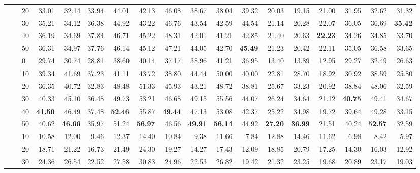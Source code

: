 \begin{table*}[!h]
{\begin{tabular}{lllrrr|rrr|rrr|rrr|rrr}
 \textbf{} & \textbf{} & 20 & 33.01 & 32.14 & 33.94 & 44.01 & 42.13 & 46.08 & 38.67 & 38.04 & 39.32 & 20.03 & 19.15 & 21.00 & 31.95 & 32.62 & 31.32 \\ 
 \textbf{} & \textbf{} & 30 & 35.21 & 34.12 & 36.38 & 44.92 & 43.22 & 46.76 & 43.54 & 42.59 & 44.54 & 21.14 & 20.28 & 22.07 & 36.05 & 36.69 & \textbf{35.42} \\ 
 \textbf{} & \textbf{} & 40 & 36.19 & 34.69 & 37.84 & 46.71 & 45.22 & 48.31 & 42.01 & 41.21 & 42.85 & 21.40 & 20.63 & \textbf{22.23} & 34.26 & 34.85 & 33.70 \\ 
 \textbf{} & \textbf{} & 50 & 36.31 & 34.97 & 37.76 & 46.14 & 45.12 & 47.21 & 44.05 & 42.70 & \textbf{45.49} & 21.23 & 20.42 & 22.11 & 35.05 & 36.58 & 33.65 \\ 
 \arrayrulecolor{gray}\cline{2-18}\arrayrulecolor{black}
\textbf{} & \textbf{\multirow{6}{*}{SC}} & 0 & 29.74 & 30.74 & 28.81 & 38.60 & 40.14 & 37.17 & 38.96 & 41.21 & 36.95 & 13.40 & 13.89 & 12.95 & 29.27 & 32.49 & 26.63 \\ 
 \textbf{} & \textbf{} & 10 & 39.34 & 41.69 & 37.23 & 41.11 & 43.72 & 38.80 & 44.44 & 50.00 & 40.00 & 22.81 & 28.70 & 18.92 & 30.92 & 38.59 & 25.80 \\ 
 \textbf{} & \textbf{} & 20 & 36.35 & 40.72 & 32.83 & 48.48 & 51.33 & 45.93 & 43.21 & 48.72 & 38.81 & 25.67 & 33.23 & 20.92 & 38.84 & 48.06 & 32.59 \\ 
 \textbf{} & \textbf{} & 30 & 40.33 & 45.10 & 36.48 & 49.73 & 53.21 & 46.68 & 49.15 & 55.56 & 44.07 & 26.24 & 34.64 & 21.12 & \textbf{40.75} & 49.41 & 34.67 \\ 
 \textbf{} & \textbf{} & 40 & \textbf{41.50} & 46.49 & 37.48 & \textbf{52.46} & 55.87 & \textbf{49.44} & 47.13 & 53.08 & 42.37 & 25.22 & 34.98 & 19.72 & 39.64 & 49.28 & 33.15 \\ 
 \textbf{} & \textbf{} & 50 & 40.62 & \textbf{46.66} & 35.97 & 51.24 & \textbf{56.97} & 46.56 & \textbf{49.91} & \textbf{56.14} & 44.92 & \textbf{27.20} & \textbf{36.99} & 21.51 & 40.24 & \textbf{52.57} & 32.59 \\ 
\hline
\hline
\textbf{\multirow{7}{*}{MVP \citep{gou2023mvp}}} & \textbf{\multirow{21}{*}{-}} & 10 & 10.58 & 12.00 & 9.46 & 12.37 & 14.40 & 10.84 & 9.38 & 11.66 & 7.84 & 12.88 & 14.46 & 11.62 & 6.98 & 8.42 & 5.97 \\ 
 \textbf{} & \textbf{} & 20 & 18.71 & 21.22 & 16.73 & 21.49 & 24.30 & 19.27 & 14.27 & 17.43 & 12.09 & 18.85 & 20.79 & 17.25 & 14.30 & 16.03 & 12.92 \\ 
 \textbf{} & \textbf{} & 30 & 24.36 & 26.54 & 22.52 & 27.58 & 30.83 & 24.96 & 22.53 & 26.82 & 19.42 & 21.32 & 23.25 & 19.68 & 20.89 & 23.17 & 19.03 \\ 

\end{tabular}}
\end{table*}
